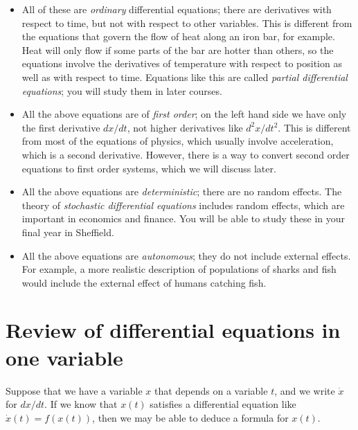 \documentclass[reqno]{amsart}
\theoremstyle{definition}
\begin{document}
\begin{itemize}
 \item All of these are \emph{ordinary} differential equations; there
  are derivatives with respect to time, but not with respect to other
  variables.  This is different from the equations that govern the
  flow of heat along an iron bar, for example.  Heat will only flow if
  some parts of the bar are hotter than others, so the equations
  involve the derivatives of temperature with respect to position as
  well as with respect to time.  Equations like this are called
  \emph{partial differential equations}; you will study them in later
  courses.
 \item All the above equations are of \emph{first order}; on the left
  hand side we have only the first derivative $dx/dt$, not higher
  derivatives like $d^2x/dt^2$.  This is different from most of the
  equations of physics, which usually involve acceleration, which is a
  second derivative.  However, there is a way to convert second order
  equations to first order systems, which we will discuss later.
 \item All the above equations are \emph{deterministic}; there are no
  random effects.  The theory of \emph{stochastic differential
   equations} includes random effects, which are important in
  economics and finance.  You will be able to study these in your
  final year in Sheffield.
 \item All the above equations are \emph{autonomous}; they do not
  include external effects.  For example, a more realistic description
  of populations of sharks and fish would include the external effect
  of humans catching fish.
\end{itemize}

\section{Review of differential equations in one variable}

Suppose that we have a variable $x$ that depends on a variable $t$,
and we write $\dot{x}$ for $dx/dt$.  If we know that $x(t)$ satisfies
a differential equation like $\dot{x}(t)=f(x(t))$, then we may be able
to deduce a formula for $x(t)$.
\end{document}
